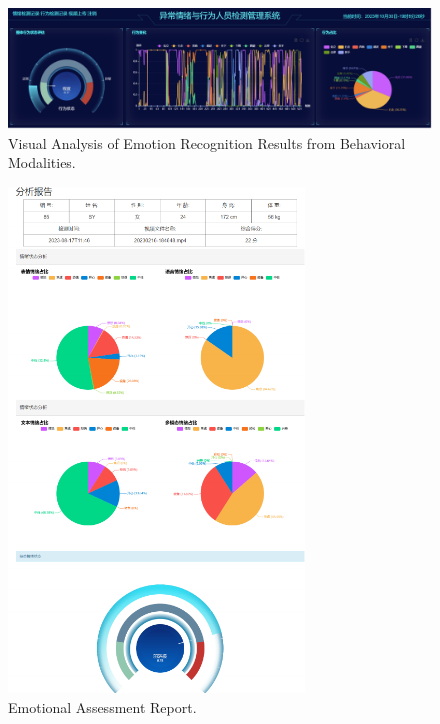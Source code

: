\documentclass[preprint,12pt]{elsarticle}
\begin{document}
\begin{figure}[!h]%
\centering
\includegraphics[width=1\textwidth]{Fig7.png}
\caption{Visual Analysis of Emotion Recognition Results from Behavioral Modalities.}\label{fig7}
\end{figure}
\begin{figure}[!h]%
\centering
\includegraphics[width=0.7\textwidth]{Fig8.png}
\caption{Emotional Assessment Report.}\label{fig8}
\end{figure}
\end{document}
